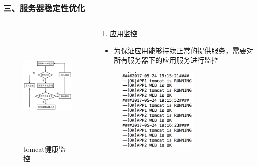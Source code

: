 \documentclass{beamer}
\begin{document}
\begin{frame}
\frametitle{三、服务器稳定性优化}
  \begin{columns}
    \begin{column}{0.60\textwidth}
      \begin{figure}
      \centering
        \includegraphics[height=6cm]{./img/tomcat.png}
        \caption{tomcat健康监控}
        \label{fig:mysql1}
      \end{figure}
    \end{column}
    \begin{column}{0.40\textwidth}
      \begin{block}{1. 应用监控}
        \begin{itemize}
          \item \footnotesize{为保证应用能够持续正常的提供服务，需要对所有服务器下的应用服务进行监控}
        \end{itemize}
      \end{block}
      \begin{figure}
      \centering
        \includegraphics[height=4cm]{./img/03/tomcat1.png}
      \end{figure}
    \end{column}
  \end{columns}
\end{frame}
\end{document}
